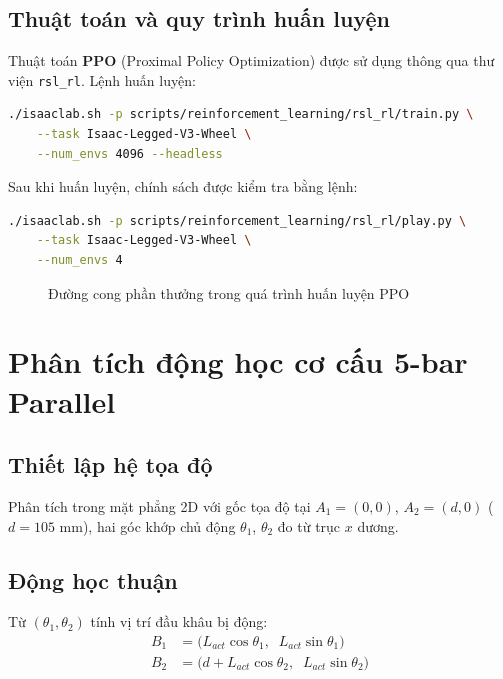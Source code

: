 \subsection{Thuật toán và quy trình huấn luyện}

Thuật toán \textbf{PPO} (Proximal Policy Optimization) được sử dụng thông qua
thư viện \texttt{rsl\_rl}. Lệnh huấn luyện:

\begin{lstlisting}[language=bash]
./isaaclab.sh -p scripts/reinforcement_learning/rsl_rl/train.py \
    --task Isaac-Legged-V3-Wheel \
    --num_envs 4096 --headless
\end{lstlisting}

Sau khi huấn luyện, chính sách được kiểm tra bằng lệnh:
\begin{lstlisting}[language=bash]
./isaaclab.sh -p scripts/reinforcement_learning/rsl_rl/play.py \
    --task Isaac-Legged-V3-Wheel \
    --num_envs 4
\end{lstlisting}

\begin{figure}[H]
    \centering
    \caption{Đường cong phần thưởng trong quá trình huấn luyện PPO}
    \label{fig:rl_curve}
\end{figure}


\section{Phân tích động học cơ cấu 5-bar Parallel}

\subsection{Thiết lập hệ tọa độ}

Phân tích trong mặt phẳng 2D với gốc tọa độ tại $A_1 = (0, 0)$,
$A_2 = (d, 0)$ ($d = 105$ mm), hai góc khớp chủ động $\theta_1$, $\theta_2$
đo từ trục $x$ dương.

\subsection{Động học thuận}

Từ $(\theta_1, \theta_2)$ tính vị trí đầu khâu bị động:
\begin{align}
    B_1 &= \bigl(L_{act}\cos\theta_1,\;\; L_{act}\sin\theta_1\bigr) \\
    B_2 &= \bigl(d + L_{act}\cos\theta_2,\;\; L_{act}\sin\theta_2\bigr)
\end{align}

